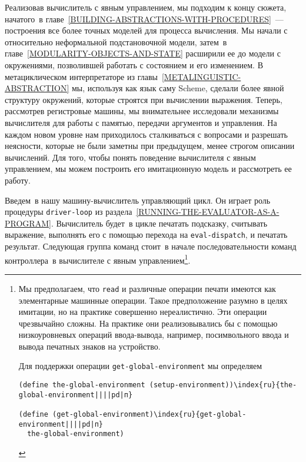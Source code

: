 Реализовав вычислитель с явным управлением, мы подходим к
концу сюжета, начатого~в 
главе~\ref{BUILDING-ABSTRACTIONS-WITH-PROCEDURES}~--- построения
все более точных 
моделей для процесса вычисления.  Мы начали с
относительно неформальной подстановочной модели, затем~в 
главе~\ref{MODULARITY-OBJECTS-AND-STATE} 
расширили ее до модели с
окружениями, позволившей работать с состоянием и его
изменением.  В метациклическом интерпретаторе из
главы~\ref{METALINGUISTIC-ABSTRACTION} мы, используя как язык
саму Scheme, 
сделали  более явной структуру окружений, которые строятся при
вычислении выражения.  Теперь, рассмотрев регистровые машины, мы
внимательнее исследовали механизмы вычислителя для работы с памятью,
передачи аргументов и управления.  На каждом новом уровне нам
приходилось сталкиваться с вопросами и разрешать неясности, которые не
были заметны при предыдущем, менее строгом описании вычислений.  Для
того, чтобы понять поведение вычислителя с явным управлением, мы можем
построить его имитационную модель и рассмотреть ее работу.

 Введем~в нашу машину-вычислитель управляющий цикл.  Он
играет роль процедуры {\tt driver-loop} из 
раздела~\ref{RUNNING-THE-EVALUATOR-AS-A-PROGRAM}.  Вычислитель
будет~в цикле печатать подсказку, считывать выражение, выполнять его с
помощью перехода на {\tt eval-dispatch}, и печатать результат.
Следующая группа команд стоит~в начале последовательности команд
контроллера~в вычислителе с явным управлением\footnote{Мы предполагаем, что {\tt read} и различные
операции печати имеются как элементарные машинные операции.  Такое
предположение разумно в целях имитации, но на практике совершенно
нереалистично.  Эти операции чрезвычайно сложны.  На практике они
реализовывались бы с помощью низкоуровневых операций ввода-вывода,
например, посимвольного ввода и вывода печатных знаков на устройство.

Для поддержки операции
{\tt get-global-environment} мы определяем

\begin{Verbatim}
(define the-global-environment (setup-environment))\index{ru}{the-global-environment||||pd|п}

(define (get-global-environment)\index{ru}{get-global-environment||||pd|п}
  the-global-environment)
\end{Verbatim} 
}. %

